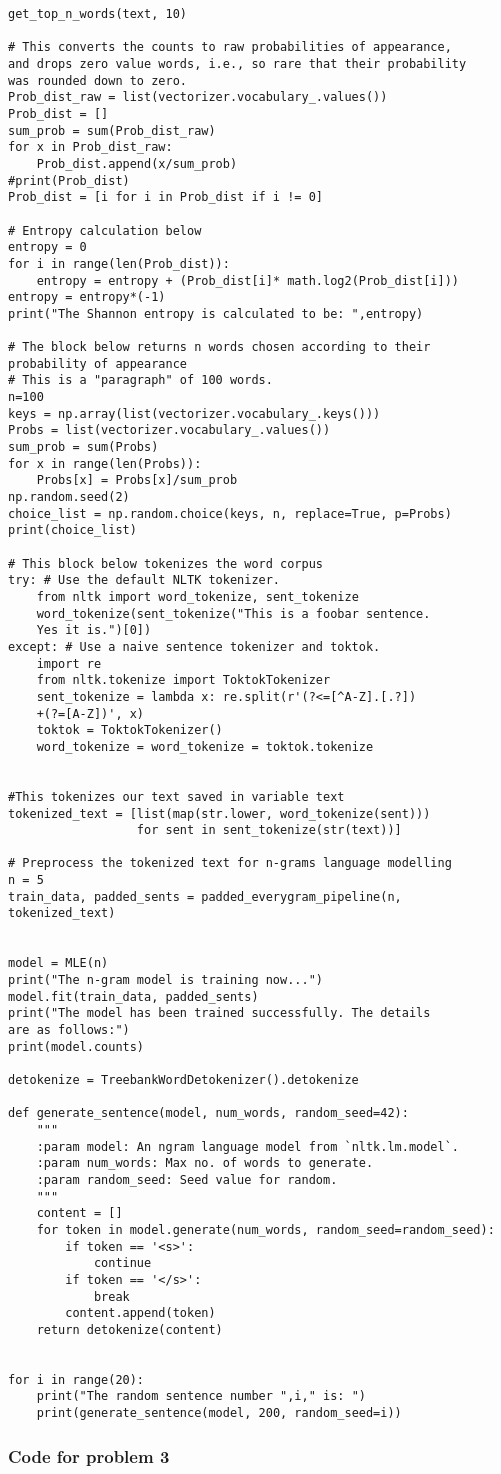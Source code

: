 \documentclass[12pt]{article}%
\begin{document}
\begin{lstlisting}
get_top_n_words(text, 10)

# This converts the counts to raw probabilities of appearance, 
and drops zero value words, i.e., so rare that their probability
was rounded down to zero.
Prob_dist_raw = list(vectorizer.vocabulary_.values())
Prob_dist = []
sum_prob = sum(Prob_dist_raw)
for x in Prob_dist_raw:
    Prob_dist.append(x/sum_prob)
#print(Prob_dist)
Prob_dist = [i for i in Prob_dist if i != 0]

# Entropy calculation below
entropy = 0
for i in range(len(Prob_dist)):
    entropy = entropy + (Prob_dist[i]* math.log2(Prob_dist[i]))
entropy = entropy*(-1)
print("The Shannon entropy is calculated to be: ",entropy)

# The block below returns n words chosen according to their
probability of appearance
# This is a "paragraph" of 100 words.
n=100
keys = np.array(list(vectorizer.vocabulary_.keys()))
Probs = list(vectorizer.vocabulary_.values())
sum_prob = sum(Probs)
for x in range(len(Probs)):
    Probs[x] = Probs[x]/sum_prob
np.random.seed(2)
choice_list = np.random.choice(keys, n, replace=True, p=Probs)
print(choice_list)

# This block below tokenizes the word corpus
try: # Use the default NLTK tokenizer.
    from nltk import word_tokenize, sent_tokenize 
    word_tokenize(sent_tokenize("This is a foobar sentence.
    Yes it is.")[0])
except: # Use a naive sentence tokenizer and toktok.
    import re
    from nltk.tokenize import ToktokTokenizer
    sent_tokenize = lambda x: re.split(r'(?<=[^A-Z].[.?]) 
    +(?=[A-Z])', x)
    toktok = ToktokTokenizer()
    word_tokenize = word_tokenize = toktok.tokenize


#This tokenizes our text saved in variable text
tokenized_text = [list(map(str.lower, word_tokenize(sent))) 
                  for sent in sent_tokenize(str(text))]

# Preprocess the tokenized text for n-grams language modelling
n = 5
train_data, padded_sents = padded_everygram_pipeline(n,
tokenized_text)


model = MLE(n)
print("The n-gram model is training now...")
model.fit(train_data, padded_sents)
print("The model has been trained successfully. The details
are as follows:")
print(model.counts)

detokenize = TreebankWordDetokenizer().detokenize

def generate_sentence(model, num_words, random_seed=42):
    """
    :param model: An ngram language model from `nltk.lm.model`.
    :param num_words: Max no. of words to generate.
    :param random_seed: Seed value for random.
    """
    content = []
    for token in model.generate(num_words, random_seed=random_seed):
        if token == '<s>':
            continue
        if token == '</s>':
            break
        content.append(token)
    return detokenize(content)


for i in range(20):
    print("The random sentence number ",i," is: ")
    print(generate_sentence(model, 200, random_seed=i))
\end{lstlisting}


\subsubsection*{Code for problem 3}
\begin{lstlisting}

\end{lstlisting}
\end{document}
